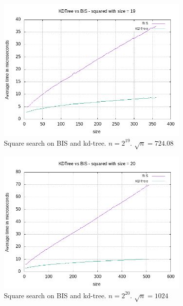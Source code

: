 \begin{figure}[h]
    \centering
    \includegraphics[width = 0.85\textwidth]{pictures/analysis/sqrt_19.png}
    \caption{Square search on BIS and kd-tree. $n=2^{19}$. $\sqrt{n} = 724.08$}\label{fig:sqrt_19}
\end{figure}

\begin{figure}[h]
    \centering
    \includegraphics[width = 0.85\textwidth]{pictures/analysis/sqrt_20.png}
    \caption{Square search on BIS and kd-tree. $n=2^{20}$. $\sqrt{n} = 1024$}\label{fig:sqrt_20}
\end{figure}

